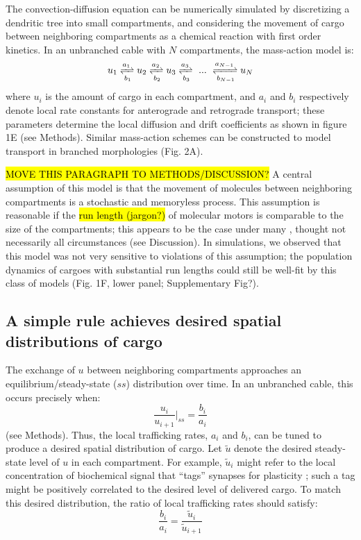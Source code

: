 \documentclass[10pt]{wlpeerj}
\begin{document}
The convection-diffusion equation can be numerically simulated by discretizing a dendritic tree into small compartments, and considering the movement of cargo between neighboring compartments as a chemical reaction with first order kinetics. In an unbranched cable with $N$ compartments, the mass-action model is:
\begin{equation}
u_1 \xrightleftharpoons[b_1]{a_1} u_2 \xrightleftharpoons[b_2]{a_2} u_3 \xrightleftharpoons[b_3]{a_3} ~...~ \xrightleftharpoons[b_{N-1}]{a_{N-1}} u_N
\end{equation}
where $u_i$ is the amount of cargo in each compartment, and $a_i$ and $b_i$ respectively denote local rate constants for anterograde and retrograde transport; these parameters determine the local diffusion and drift coefficients as shown in figure 1E (see Methods). Similar mass-action schemes can be constructed to model transport in branched morphologies (Fig. 2A).

\hl{MOVE THIS PARAGRAPH TO METHODS/DISCUSSION?} A central assumption of this model is that the movement of molecules between neighboring compartments is a stochastic and memoryless process. This assumption is reasonable if the \hl{run length (jargon?)} of molecular motors is comparable to the size of the compartments; this appears to be the case under many \citep{Muller_2008,Verbrugge_2009}, thought not necessarily all \citep{Dynes_2007} circumstances (see Discussion). In simulations, we observed that this model was not very sensitive to violations of this assumption; the population dynamics of cargoes with substantial run lengths could still be well-fit by this class of models (Fig. 1F, lower panel; Supplementary Fig?).

\subsection*{A simple rule achieves desired spatial distributions of cargo}

The exchange of $u$ between neighboring compartments approaches an equilibrium/steady-state ($ss$) distribution over time. In an unbranched cable, this occurs precisely when:
\begin{equation}
\frac{u_i}{u_{i+1}} \Bigg|_{ss} = \frac{b_i}{a_i}
\end{equation}
(see Methods). Thus, the local trafficking rates, $a_i$ and $b_i$, can be tuned to produce a desired spatial distribution of cargo. Let $\tilde{u}$ denote the desired steady-state level of $u$ in each compartment. For example, $\tilde{u}_i$ might refer to the local concentration of biochemical signal that ``tags'' synapses for plasticity \citep{Frey_1997}; such a tag might be positively correlated to the desired level of delivered cargo. To match this desired distribution, the ratio of local trafficking rates should satisfy:
\begin{equation}
\frac{b_i}{a_i} = \frac{\tilde{u}_i}{\tilde{u}_{i+1}}
\end{equation}
\end{document}
